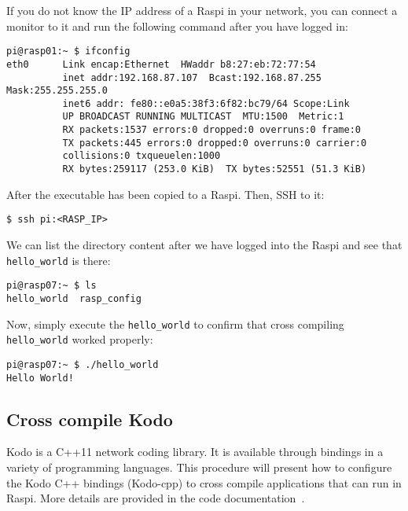 If you do not know the \ac{IP} address of a \ac{Raspi} in your network, you can
connect a monitor to it and run the following command after you have logged in:
\begin{lstlisting}[]
pi@rasp01:~ $ ifconfig
eth0      Link encap:Ethernet  HWaddr b8:27:eb:72:77:54
          inet addr:192.168.87.107  Bcast:192.168.87.255  Mask:255.255.255.0
          inet6 addr: fe80::e0a5:38f3:6f82:bc79/64 Scope:Link
          UP BROADCAST RUNNING MULTICAST  MTU:1500  Metric:1
          RX packets:1537 errors:0 dropped:0 overruns:0 frame:0
          TX packets:445 errors:0 dropped:0 overruns:0 carrier:0
          collisions:0 txqueuelen:1000
          RX bytes:259117 (253.0 KiB)  TX bytes:52551 (51.3 KiB)

\end{lstlisting}
\FloatBarrier
\vspace{-5mm}

After the executable has been copied to a \ac{Raspi}. Then, \ac{SSH} to it:

\begin{lstlisting}[]
$ ssh pi:<RASP_IP>
\end{lstlisting}
\FloatBarrier
\vspace{-5mm}

We can list the directory content after we have logged into the \ac{Raspi} and
see that \texttt{hello\_world} is there:

\begin{lstlisting}[]
pi@rasp07:~ $ ls
hello_world  rasp_config
\end{lstlisting}
\FloatBarrier
\vspace{-5mm}

Now, simply execute the \texttt{hello\_world} to confirm that cross compiling
\texttt{hello\_world} worked properly:

\begin{lstlisting}[]
pi@rasp07:~ $ ./hello_world
Hello World!
\end{lstlisting}
\FloatBarrier
\vspace{-5mm}

\subsection{Cross compile Kodo}

Kodo is a C++11 network coding library. It is available through bindings in
a variety of programming languages.
This procedure will present how to configure the Kodo C++ bindings (Kodo-cpp)
to cross compile applications that can run in \ac{Raspi}. More details are
provided in the code documentation~\cite{kodocppdoc}.

